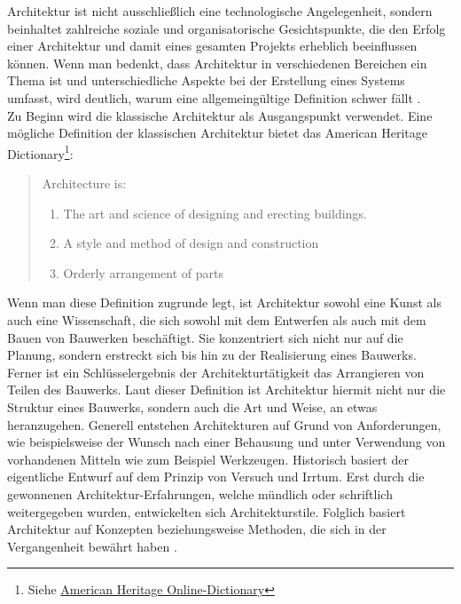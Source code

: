 Architektur ist nicht ausschließlich eine technologische Angelegenheit, sondern beinhaltet zahlreiche soziale und organisatorische Gesichtspunkte, die den Erfolg einer Architektur und damit eines gesamten Projekts erheblich beeinflussen können. Wenn man bedenkt, dass Architektur in verschiedenen Bereichen ein Thema ist und unterschiedliche Aspekte bei der Erstellung eines Systems umfasst, wird deutlich, warum eine allgemeingültige Definition schwer fällt \citereset \autocite{Vogel.2009}.\\
Zu Beginn wird die klassische Architektur als Ausgangspunkt verwendet. Eine mögliche Definition der klassischen Architektur bietet das \glqq American Heritage Dictionary\footnote{Siehe \href{http://ahdictionary.com/word/search.html?q=architecture&submit.x=39&submit.y=20}{American Heritage Online-Dictionary}}\grqq :
\begin{quote}
  Architecture is:
  \begin{enumerate}
    \item The art and science of designing and erecting buildings.
    \item A style and method of design and construction
    \item Orderly arrangement of parts
  \end{enumerate}
\end{quote}

Wenn man diese Definition zugrunde legt, ist Architektur sowohl eine Kunst als auch eine Wissenschaft, die sich sowohl mit dem Entwerfen als auch mit dem Bauen von Bauwerken beschäftigt. Sie konzentriert sich nicht nur auf die Planung, sondern erstreckt sich bis hin zu der Realisierung eines Bauwerks. Ferner ist ein Schlüsselergebnis der Architekturtätigkeit das Arrangieren von Teilen des Bauwerks. Laut dieser Definition ist Architektur hiermit nicht nur die Struktur eines Bauwerks, sondern auch die Art und Weise, an etwas heranzugehen. Generell entstehen Architekturen auf Grund von Anforderungen, wie beispielsweise der Wunsch nach einer Behausung und unter Verwendung von vorhandenen Mitteln wie zum Beispiel Werkzeugen. Historisch basiert der eigentliche Entwurf auf dem Prinzip von Versuch und Irrtum. Erst durch die gewonnenen Architektur-Erfahrungen, welche mündlich oder schriftlich weitergegeben wurden, entwickelten sich Architekturstile. Folglich basiert Architektur auf Konzepten beziehungsweise Methoden, die sich in der Vergangenheit bewährt haben \citereset \autocite{Vogel.2009}.\\

